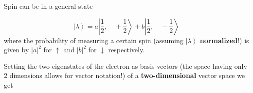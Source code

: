 
Spin can be in a general state

\begin{equation*}
    \left|\lambda\right>=a\left|\frac{1}{2},\quad +\frac{1}{2}\right>+b\left|\frac{1}{2},\quad -\frac{1}{2}\right>
\end{equation*}
where the probability of measuring a certain spin (assuming $\left|\lambda\right>$ \textbf{normalized}!) is given by $|a|^2$ for $\uparrow$ and $|b|^2$ for $\downarrow$ respectively.

\newpar{}

Setting the two eigenstates of the electron as basis vectors (the space having only 2 dimensions allows for vector notation!) of a \textbf{two-dimensional} vector space we get

